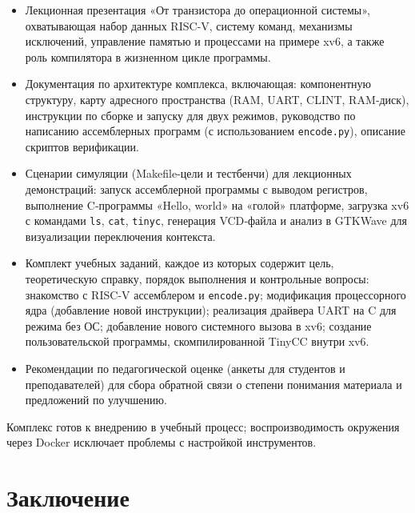 \begin{itemize}
\item Лекционная презентация «От транзистора до операционной системы», охватывающая набор данных RISC‑V, систему команд, механизмы исключений, управление памятью и процессами на примере xv6, а также роль компилятора в жизненном цикле программы.
\item Документация по архитектуре комплекса, включающая: компонентную структуру, карту адресного пространства (RAM, UART, CLINT, RAM‑диск), инструкции по сборке и запуску для двух режимов, руководство по написанию ассемблерных программ (с использованием \texttt{encode.py}), описание скриптов верификации.
\item Сценарии симуляции (Makefile‑цели и тестбенчи) для лекционных демонстраций: запуск ассемблерной программы с выводом регистров, выполнение C‑программы «Hello, world» на «голой» платформе, загрузка xv6 с командами \texttt{ls}, \texttt{cat}, \texttt{tinyc}, генерация VCD‑файла и анализ в GTKWave для визуализации переключения контекста.
\item Комплект учебных заданий, каждое из которых содержит цель, теоретическую справку, порядок выполнения и контрольные вопросы: знакомство с RISC‑V ассемблером и \texttt{encode.py}; модификация процессорного ядра (добавление новой инструкции); реализация драйвера UART на C для режима без ОС; добавление нового системного вызова в xv6; создание пользовательской программы, скомпилированной TinyCC внутри xv6.
\item Рекомендации по педагогической оценке (анкеты для студентов и преподавателей) для сбора обратной связи о степени понимания материала и предложений по улучшению.
\end{itemize}

Комплекс готов к внедрению в учебный процесс; воспроизводимость окружения через Docker исключает проблемы с настройкой инструментов.


\section{Заключение}

